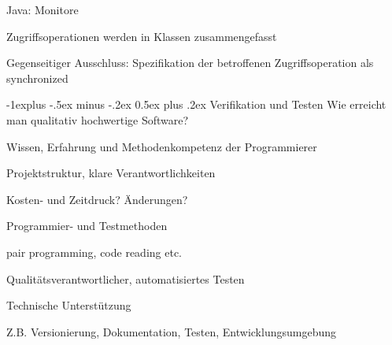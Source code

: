 \documentclass[a4paper]{article}
\makeatletter
\renewcommand{\subsection}{\@startsection{subsection}{2}{0mm}%
                                {-1explus -.5ex minus -.2ex}%
                                {0.5ex plus .2ex}%
                                {\normalfont\normalsize\bfseries}}
\makeatother
\begin{document}
\begin{multicols}{3}
  Java: Monitore
  \begin{itemize*}
    \item Zugriffsoperationen werden in Klassen zusammengefasst
    \item Gegenseitiger Ausschluss: Spezifikation der betroffenen Zugriffsoperation als synchronized
  \end{itemize*}

  \subsection{Verifikation und Testen}
  Wie erreicht man qualitativ hochwertige Software?
  \begin{itemize*}
    \item Wissen, Erfahrung und Methodenkompetenz der Programmierer
    \item Projektstruktur, klare Verantwortlichkeiten
    \item Kosten- und Zeitdruck? Änderungen?
    \item Programmier- und Testmethoden
          \begin{itemize*}
            \item pair programming, code reading etc.
            \item Qualitätsverantwortlicher, automatisiertes Testen
          \end{itemize*}
    \item Technische Unterstützung
          \begin{itemize*}
            \item Z.B. Versionierung, Dokumentation, Testen, Entwicklungsumgebung
          \end{itemize*}
  \end{itemize*}


\end{multicols}
\end{document}
